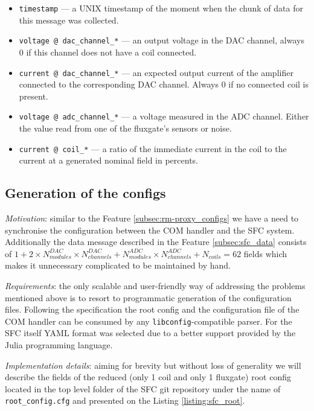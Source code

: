 \begin{itemize}
	\item \texttt{timestamp} --- a UNIX timestamp of the moment when the chunk of data for this message was collected.
	\item \texttt{voltage @ dac\_channel\_*} --- an output voltage in the DAC channel, always 0 if this channel does not have a coil connected.
	\item \texttt{current @ dac\_channel\_*} --- an expected output current of the amplifier connected to the corresponding DAC channel. Always 0 if no connected coil is present.
	\item \texttt{voltage @ adc\_channel\_*} --- a voltage measured in the ADC channel. Either the value read from one of the fluxgate's sensors or noise.
	\item \texttt{current @ coil\_*} --- a ratio of the immediate current in the coil to the current at a generated nominal field in percents.
\end{itemize}

\subsection{Generation of the configs}
\label{subsec:sfc_configs}


\textit{Motivation}: similar to the Feature \ref{subsec:rm-proxy_configs} we have a need to synchronise the configuration between the COM handler and the SFC system. Additionally the data message described in the Feature \ref{subsec:sfc_data} consists of $1 + 2 \times N_{modules}^{DAC} \times N_{channels}^{DAC} + N_{modules}^{ADC} \times N_{channels}^{ADC} + N_{coils} = 62$ fields which makes it unnecessary complicated to be maintained by hand.

\textit{Requirements}: the only scalable and user-friendly way of addressing the problems mentioned above is to resort to programmatic generation of the configuration files. Following the specification \cite{Bison2018} the root config and the configuration file of the COM handler can be consumed by any \texttt{libconfig}-compatible parser. For the SFC itself YAML format was selected due to a better support provided by the Julia programming language.

\textit{Implementation details}: aiming for brevity but without loss of generality we will describe the fields of the reduced (only 1 coil and only 1 fluxgate) root config located in the top level folder of the SFC git repository under the name of \texttt{root\_config.cfg} and presented on the Listing \ref{listing:sfc_root}.

